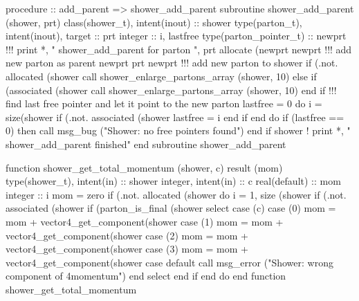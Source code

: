 \eatline
\nwendcode{}\nwdocspar
\nwenddocs{}\plusendmoddef
  procedure :: add_parent => shower_add_parent
\nwendcode{}\plusendmoddef
  subroutine shower_add_parent (shower, prt)
    class(shower_t), intent(inout) :: shower
    type(parton_t), intent(inout), target :: prt
    integer :: i, lastfree
    type(parton_pointer_t) :: newprt
    !!! print *, " shower_add_parent for parton ", prt%
    allocate (newprt%
    newprt%
    !!! add new parton as parent
    newprt%
    prt%
    newprt%
    !!! add new parton to shower%
    if (.not. allocated (shower%
       call shower_enlarge_partons_array (shower, 10)
    else if (associated (shower%
       call shower_enlarge_partons_array (shower, 10)
    end if
    !!! find last free pointer and let it point to the new parton
    lastfree = 0
    do i = size(shower%
       if (.not. associated (shower%
          lastfree = i
       end if
    end do
    if (lastfree == 0) then
       call msg_bug ("Shower: no free pointers found")
    end if
    shower%
    ! print *, "  shower_add_parent finished"
  end subroutine shower_add_parent

\eatline
\nwendcode{}\nwdocspar
\nwenddocs{}\plusendmoddef
  function shower_get_total_momentum (shower, c) result (mom)
    type(shower_t), intent(in) :: shower
    integer, intent(in) :: c
    real(default) :: mom
    integer :: i
    mom = zero
    if (.not. allocated (shower%
    do i = 1, size (shower%
       if (.not. associated (shower%
       if (parton_is_final (shower%
          select case (c)
          case (0)
             mom = mom + vector4_get_component(shower%
          case (1)
             mom = mom + vector4_get_component(shower%
          case (2)
             mom = mom + vector4_get_component(shower%
          case (3)
             mom = mom + vector4_get_component(shower%
          case default
             call msg_error ("Shower: wrong component of 4momentum")
          end select
       end if
    end do
  end function shower_get_total_momentum

